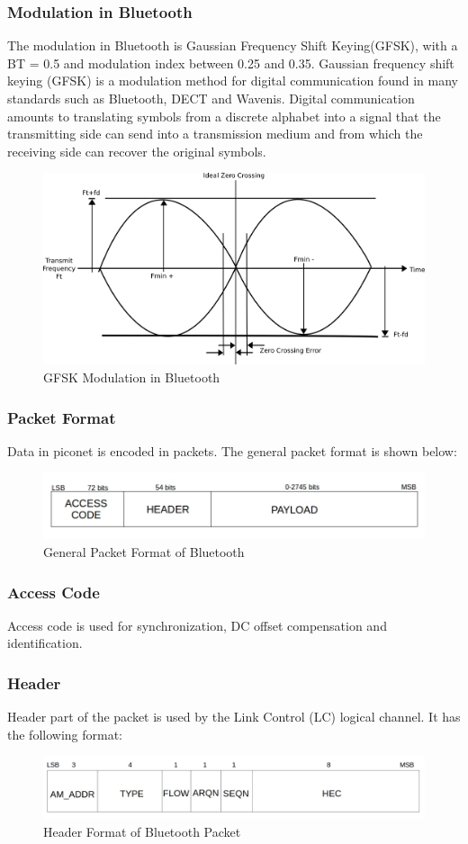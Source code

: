 \subsubsection*{Modulation in Bluetooth}
The modulation in Bluetooth is Gaussian Frequency Shift Keying\cite{bluetooth2}(GFSK), with a BT = 0.5 and modulation index between 0.25 and 0.35.
Gaussian frequency shift keying (GFSK) is a modulation method for digital communication found in many standards such as Bluetooth, DECT and Wavenis. Digital communication amounts to translating symbols from a discrete alphabet into a signal that the transmitting side can send into a transmission medium and from which the receiving side can recover the original symbols.
\begin{figure}[h]
\center
\includegraphics[scale=01]{sinewave.png}  
\caption{GFSK Modulation in Bluetooth}
\end{figure}
\subsubsection{Packet Format}
Data in piconet is encoded in packets. The general packet format is shown below:
\begin{figure}[h]
\center
\includegraphics[scale=0.5]{first.jpg} 
\caption{General Packet Format of Bluetooth}
\end{figure}
\subsubsection*{Access Code}
Access code is used for synchronization, DC offset compensation and identification.
\subsubsection*{Header}
Header part of the packet is used by the Link Control (LC) logical channel. It has the following format:
\begin{figure}[h]
\center
\includegraphics[scale=0.2]{second.jpg}
\caption{Header Format of Bluetooth Packet}
\end{figure}
